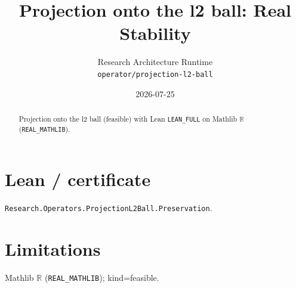 \documentclass[11pt]{article}
\title{Projection onto the l2 ball: Real Stability}
\author{Research Architecture Runtime \\ \texttt{operator/projection-l2-ball}}
\date{2026-07-25}
\begin{document}
\maketitle
\begin{abstract}
Projection onto the l2 ball (feasible) with Lean \texttt{LEAN\_FULL} on Mathlib $\mathbb{R}$ (\texttt{REAL\_MATHLIB}).
\end{abstract}
\section{Lean / certificate}
\texttt{Research.Operators.ProjectionL2Ball.Preservation}.
\section{Limitations}
Mathlib $\mathbb{R}$ (\texttt{REAL\_MATHLIB}); kind=feasible.
\end{document}
